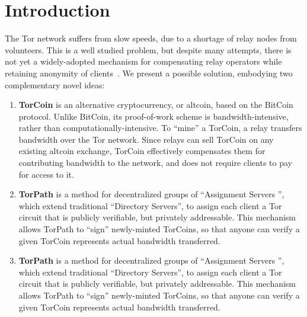 \section{Introduction}

The Tor network suffers from slow speeds, due to a shortage of relay nodes
from volunteers. This is a well studied problem, but despite many attempts,
there is not yet a widely-adopted mechanism for compensating relay operators
while retaining anonymity of clients~\cite{raykova-
pet2008, wpes09-xpay, incentives-fc10, ccs10-braids, acsac11-tortoise,
jansen2013lira, johnson2013onions}. We present a possible solution, embodying
two complementary novel ideas:

\begin{enumerate}
\item \textbf{TorCoin} is an alternative cryptocurrency, or altcoin, based on
the BitCoin protocol\cite{nakamoto2008bitcoin}. Unlike BitCoin, its proof-of-work 
scheme is bandwidth-intensive, rather than computationally-intensive. To ``mine'' 
a TorCoin, a relay transfers bandwidth over the Tor network. Since relays can sell 
TorCoin on any existing altcoin exchange, TorCoin effectively compensates them for 
contributing bandwidth to the network, and does not require clients to pay for 
access to it.

\item \textbf{TorPath} is a method for decentralized groups of ``Assignment Servers
'', which extend traditional ``Directory Servers'', to assign each client a Tor 
circuit that is publicly verifiable, but privately addressable. This mechanism 
allows TorPath to ``sign'' newly-minted TorCoins, so that anyone can verify a 
given TorCoin represents actual bandwidth transferred. 

\item \textbf{TorPath} is a method for decentralized groups of ``Assignment Servers
'', which extend traditional ``Directory Servers'', to assign each client a Tor 
circuit that is publicly verifiable, but privately addressable. This mechanism allows TorPath to ``sign'' newly-minted TorCoins, so that anyone can verify a 
given TorCoin represents actual bandwidth transferred. 
\end{enumerate}
